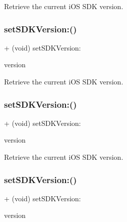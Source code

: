 Retrieve the current i\+OS S\+DK version. \mbox{\label{interfaceFBSettings_afd9810381ac6027e6400879cb68ba46e}} 
\subsubsection{\texorpdfstring{set\+S\+D\+K\+Version\+:()}{setSDKVersion:()}\hspace{0.1cm}{\footnotesize\ttfamily [2/5]}}
{\footnotesize\ttfamily + (void) set\+S\+D\+K\+Version\+: \begin{DoxyParamCaption}\item[{(N\+S\+String $\ast$)}]{version }\end{DoxyParamCaption}}

Retrieve the current i\+OS S\+DK version. \mbox{\label{interfaceFBSettings_afd9810381ac6027e6400879cb68ba46e}} 
\subsubsection{\texorpdfstring{set\+S\+D\+K\+Version\+:()}{setSDKVersion:()}\hspace{0.1cm}{\footnotesize\ttfamily [3/5]}}
{\footnotesize\ttfamily + (void) set\+S\+D\+K\+Version\+: \begin{DoxyParamCaption}\item[{(N\+S\+String $\ast$)}]{version }\end{DoxyParamCaption}}

Retrieve the current i\+OS S\+DK version. \mbox{\label{interfaceFBSettings_afd9810381ac6027e6400879cb68ba46e}} 
\subsubsection{\texorpdfstring{set\+S\+D\+K\+Version\+:()}{setSDKVersion:()}\hspace{0.1cm}{\footnotesize\ttfamily [4/5]}}
{\footnotesize\ttfamily + (void) set\+S\+D\+K\+Version\+: \begin{DoxyParamCaption}\item[{(N\+S\+String $\ast$)}]{version }\end{DoxyParamCaption}}

